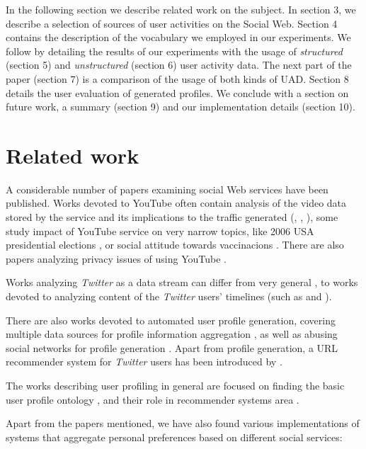 In the following section we describe related work on the subject. In section 3, we describe
a selection of sources of user activities on the Social Web. Section 4 contains the description of
the vocabulary we employed in our experiments. We follow by detailing the results of our experiments
with the usage of \textit{structured} (section 5) and \textit{unstructured} (section 6) user activity data.
The next part of the paper (section 7) is a comparison of the usage of both kinds of UAD. Section 8
details the user evaluation of generated profiles. We conclude with a section on future
work, a summary (section 9) and our implementation details (section 10).

\section{Related work}

A considerable number of papers examining social Web services have been
published. Works devoted to YouTube often contain analysis of the video data
stored by the service and its implications to the traffic generated
(\cite{i-tube-you-tube}, \cite{views-from-the-edge},
\cite{statistics-and-social-network}), some study impact of YouTube service on
very narrow topics, like 2006 USA presidential elections
\cite{voters-myspace-youtube}, or social attitude towards vaccinacions
\cite{keelan}. There are also papers analyzing privacy issues of using YouTube
\cite{publicly-private}.

Works analyzing \textit{Twitter} as a data stream can differ from very general \cite{why-we-twitter},
to works devoted to analyzing content of the \textit{Twitter} users' timelines (such as \cite{twitter-content-is-it} and \cite{short-tweet}).

There are also works devoted to automated user profile generation, covering multiple data sources for profile
information aggregation \cite{public-profiles}, as well as abusing social networks for profile generation \cite{twitter-abuse}. Apart from profile generation, a URL recommender system for \textit{Twitter} users
has been introduced by \cite{short-tweet}.

The works describing user profiling in general are focused on finding the basic user profile ontology \cite{creating-ontology-for-user-profile}, and their role in recommender systems area \cite{ontological-user-profiling}.

Apart from the papers mentioned, we have also found various implementations of systems that aggregate personal preferences based on different
social services:


